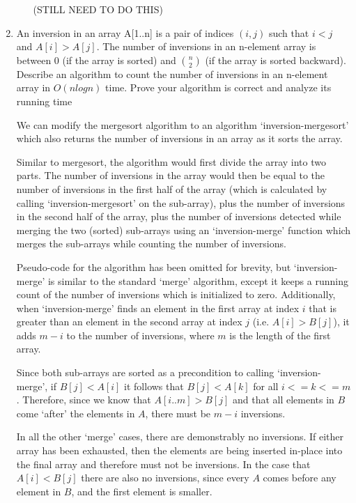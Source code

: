 \documentclass{article}
\newcommand{\question}[1]{\bgroup\color{blue}#1\egroup}
\begin{document}
\begin{enumerate}
\begin{enumerate}
(STILL NEED TO DO THIS)

    \end{enumerate}

\item 
  \question{An inversion in an array A[1..n] is a pair of indices $(i, j)$ such that $i < j$ and
$A[i] > A[j]$. The number of inversions in an n-element array is between 0 (if the array is sorted)
and $n \choose 2$ (if the array is sorted backward). Describe an algorithm to count the number of inversions
in an n-element array in $O(n log n)$ time. Prove your algorithm is correct and analyze its running
time
}


We can modify the mergesort algorithm to an algorithm `inversion-mergesort' which also returns the number of inversions in an array as it sorts the array.

Similar to mergesort, the algorithm would first divide the array into two parts. 
The number of inversions in the array would then be equal to the number of inversions in the first half of the array (which is calculated by calling `inversion-mergesort' on the sub-array), plus the number of inversions in the second half of the array, plus the number of inversions detected while merging the two (sorted) sub-arrays using an `inversion-merge' function which merges the sub-arrays while counting the number of inversions.

Pseudo-code for the algorithm has been omitted for brevity, but `inversion-merge' is similar to the standard `merge' algorithm, except it keeps a running count of the number of inversions which is initialized to zero. 
Additionally, when `inversion-merge' finds an element in the first array at index $i$ that is greater than an element in the second array at index $j$ (i.e. $A[i] > B[j]$), it adds $m-i$ to the number of inversions, where $m$ is the length of the first array.

Since both sub-arrays are sorted as a precondition to calling `inversion-merge', if $B[j] < A[i]$ it follows that $B[j] < A[k]$ for all $i <= k <=m$. Therefore, since we know that $A[i..m] > B[j]$ and that all elements in $B$ come `after' the elements in $A$, there must be $m-i$ inversions.

In all the other `merge' cases, there are demonstrably no inversions. If either array has been exhausted, then the elements are being inserted in-place into the final array and therefore must not be inversions. In the case that $A[i] < B[j]$ there are also no inversions, since every $A$ comes before any element in $B$, and the first element is smaller.


\end{enumerate}
\end{document}

